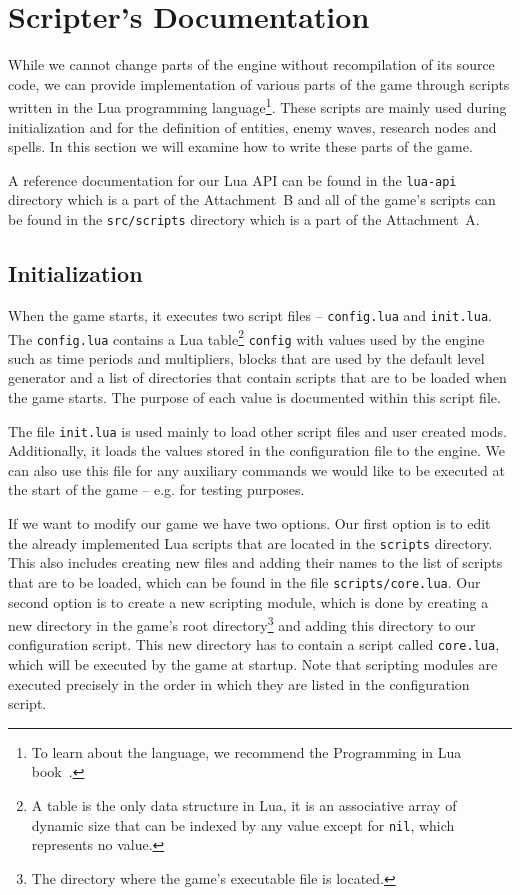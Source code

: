 \chapter{Scripter's Documentation}

While we cannot change parts of the engine without recompilation of its source code, we can provide implementation of various parts of the
game through scripts written in the Lua programming language\footnote{To learn about the language, we recommend the Programming in Lua
book~\cite{PIL}.}. These scripts are mainly used during initialization and for the definition of
entities, enemy waves, research nodes and spells. In this section we will examine how to write these parts of the game.

A reference documentation for our Lua API can be found in the \texttt{lua-api} directory which is a part of the Attachment~B and all
of the game's scripts can be found in the \texttt{src/scripts} directory which is a part of the Attachment~A.

\section{Initialization}

When the game starts, it executes two script files -- \texttt{config.lua} and \texttt{init.lua}. The \texttt{config.lua} contains
a Lua table\footnote{A table is the only data structure in Lua, it is an associative array of dynamic size that can be indexed
by any value except for \texttt{nil}, which represents no value.}
\texttt{config} with values used by the engine such as time periods and multipliers, blocks that are used by the default
level generator and a list of directories that contain scripts that are to be loaded when the game starts. The purpose of each value
is documented within this script file.

The file \texttt{init.lua} is used mainly to load other script files and user created mods. Additionally, it loads the values stored
in the configuration file to the engine. We can also use this file for any auxiliary commands we would like to be executed at the
start of the game -- e.g. for testing purposes.

If we want to modify our game we have two options. Our first option is to edit the already implemented Lua scripts that are located in the
\texttt{scripts} directory. This also includes creating new files and adding their names to the list of scripts that are to be loaded,
which can be found in the file \texttt{scripts/core.lua}. Our second option is to create a new scripting module, which is done by creating
a new directory in the game's root directory\footnote{The directory where the game's executable file is located.}
and adding this directory to our configuration script. This new directory has to contain a
script called \texttt{core.lua}, which will be executed by the game at startup. Note that scripting modules are executed precisely in
the order in which they are listed in the configuration script.

